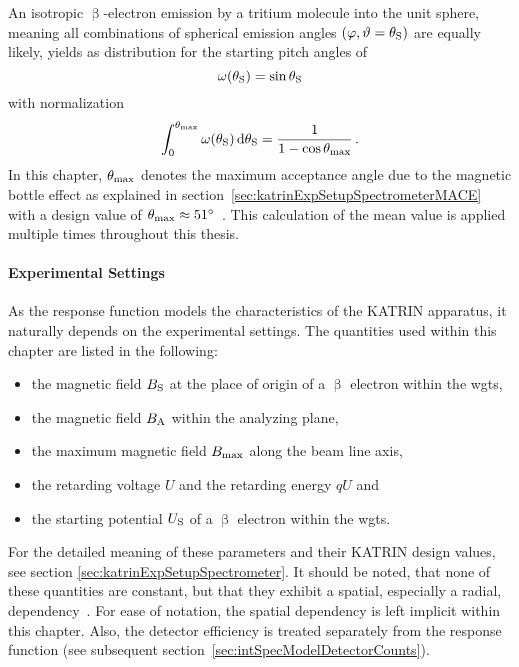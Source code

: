 An isotropic $\upbeta$-electron emission by a tritium molecule into the unit sphere, meaning all combinations of spherical emission angles $(\varphi, \vartheta=\theta_\mathrm{S})$ are equally likely, yields as distribution for the starting pitch angles of~\cite{Angrik:2005ep}
\begin{equation}
\omega(\theta_\mathrm{S}) = \sin\theta_\mathrm{S}
\end{equation}
with normalization
\begin{equation}
	\int_{0}^{\theta_\mathrm{max}} 
	\omega(\theta_\mathrm{S})
	\mathop{}\!\mathrm{d} \theta_\mathrm{S} = 
	\frac{1}{1-\cos\theta_\mathrm{max}}
	\text{\,.}
\end{equation}
In this chapter, $\theta_\mathrm{max}$ denotes the maximum acceptance angle due to the magnetic bottle effect as explained in section~\ref{sec:katrinExpSetupSpectrometerMACE} with a design value of $\theta_\mathrm{max}\approx\SI{51}{\degree}$~\cite{Angrik:2005ep}. This calculation of the mean value is applied multiple times throughout this thesis.

\paragraph{Experimental Settings}
As the response function models the characteristics of the KATRIN apparatus, it naturally depends on the experimental settings. The quantities used within this chapter are listed in the following:
\begin{itemize}
	\item the magnetic field $B_\mathrm{S}$ at the place of origin of a $\upbeta$ electron within the \gls{wgts},
	\item the magnetic field $B_\mathrm{A}$ within the analyzing plane,
	\item the maximum magnetic field $B_\mathrm{max}$ along the beam line axis,
	\item the retarding voltage $U$ and the retarding energy $qU$ and
	\item the starting potential $U_\mathrm{S}$ of a $\upbeta$ electron within the \gls{wgts}.
\end{itemize}
For the detailed meaning of these parameters and their KATRIN design values, see section \ref{sec:katrinExpSetupSpectrometer}.
It should be noted, that none of these quantities are constant, but that they exhibit a spatial, especially a radial, dependency~\cite{Angrik:2005ep}. For ease of notation, the spatial dependency is left implicit within this chapter. Also, the detector efficiency is treated separately from the response function (see subsequent section~\ref{sec:intSpecModelDetectorCounts}).

